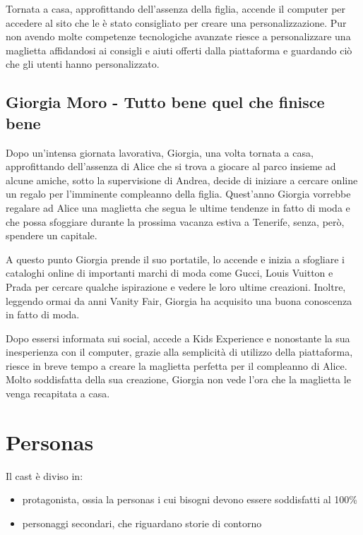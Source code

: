 \documentclass[12pt,italian,]{report}
\providecommand{\tightlist}{%
  \setlength{\itemsep}{0pt}\setlength{\parskip}{0pt}}
\begin{document}
Tornata a casa, approfittando dell'assenza della figlia, accende il
computer per accedere al sito che le è stato consigliato per creare una
personalizzazione. Pur non avendo molte competenze tecnologiche avanzate
riesce a personalizzare una maglietta affidandosi ai consigli e aiuti
offerti dalla piattaforma e guardando ciò che gli utenti hanno
personalizzato.

\hypertarget{giorgia-moro---tutto-bene-quel-che-finisce-bene}{%
\subsection{Giorgia Moro - Tutto bene quel che finisce
bene}\label{giorgia-moro---tutto-bene-quel-che-finisce-bene}}

Dopo un'intensa giornata lavorativa, Giorgia, una volta tornata a casa,
approfittando dell'assenza di Alice che si trova a giocare al parco
insieme ad alcune amiche, sotto la supervisione di Andrea, decide di
iniziare a cercare online un regalo per l'imminente compleanno della
figlia. Quest'anno Giorgia vorrebbe regalare ad Alice una maglietta che
segua le ultime tendenze in fatto di moda e che possa sfoggiare durante
la prossima vacanza estiva a Tenerife, senza, però, spendere un
capitale.

A questo punto Giorgia prende il suo portatile, lo accende e inizia a
sfogliare i cataloghi online di importanti marchi di moda come Gucci,
Louis Vuitton e Prada per cercare qualche ispirazione e vedere le loro
ultime creazioni. Inoltre, leggendo ormai da anni Vanity Fair, Giorgia
ha acquisito una buona conoscenza in fatto di moda.

Dopo essersi informata sui social, accede a Kids Experience e nonostante
la sua inesperienza con il computer, grazie alla semplicità di utilizzo
della piattaforma, riesce in breve tempo a creare la maglietta perfetta
per il compleanno di Alice. Molto soddisfatta della sua creazione,
Giorgia non vede l'ora che la maglietta le venga recapitata a casa.

\hypertarget{personas}{%
\section{Personas}\label{personas}}

Il cast è diviso in:

\begin{itemize}
\tightlist
\item
  protagonista, ossia la personas i cui bisogni devono essere soddisfatti
  al 100\%
\item
  personaggi secondari, che riguardano storie di contorno
\end{itemize}
\end{document}
